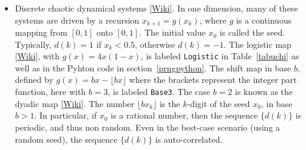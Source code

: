 \documentclass[oneside,10pt]{book}
\begin{document}
\begin{itemize}
\item Discrete chaotic \textcolor{index}{dynamical systems} [\href{https://en.wikipedia.org/wiki/Dynamical_system}{Wiki}]. 
 In one dimension, many of these systems are driven by a recursion $x_{k+1}=g(x_k)$, where $g$ is a continuous mapping from
$[0,1]$ onto $[0,1]$. The initial value $x_0$ is called the seed. Typically, $d(k)=1$ if $x_k<0.5$, otherwise $d(k)=-1$. The \textcolor{index}{logistic map} [\href{https://en.wikipedia.org/wiki/Logistic_map}{Wiki}], with $g(x)=4x(1-x)$, is labeled \texttt{Logistic} in Table~\ref{tabuchi} as well as in the Pyhton code
 in section~\ref{prngpython}. The \textcolor{index}{shift map} in base $b$, defined by $g(x)=bx-\lfloor bx\rfloor$ where the brackets represent the integer part function, here with $b=3$, is labeled  
\texttt{Base3}. The case $b=2$ is known as the 
 \textcolor{index}{dyadic map} [\href{https://en.wikipedia.org/wiki/Dyadic_transformation}{Wiki}]. 
The number $\lfloor bx_k\rfloor$
  is the $k$-digit of the seed $x_0$, in base $b>1$. In particular, if $x_0$ is a rational number, then the sequence
$\{d(k)\}$ is periodic, and thus non random. Even in the best-case scenario (using a random seed), the sequence $\{d(k)\}$ is auto-correlated. 


\end{itemize}
\end{document}
